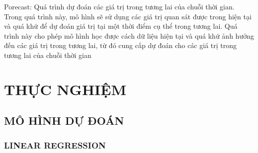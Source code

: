 \documentclass[conference]{IEEEtran}
\begin{document}
            Porecast: Quá trình dự đoán các giá trị trong tương lai của chuỗi thời gian. Trong quá trình này, mô hình sẽ sử dụng các giá trị quan sát được trong hiện tại và quá khứ để dự đoán giá trị tại một thời điểm cụ thể trong tương lai. Quá trình này cho phép mô hình học được cách dữ liệu hiện tại và quá khứ ảnh hưởng đến các giá trị trong tương lai, từ đó cung cấp dự đoán cho các giá trị trong tương lai của chuỗi thời gian

\section{THỰC NGHIỆM}

\subsection{MÔ HÌNH DỰ ĐOÁN }

\subsubsection{LINEAR REGRESSION}
\end{document}
